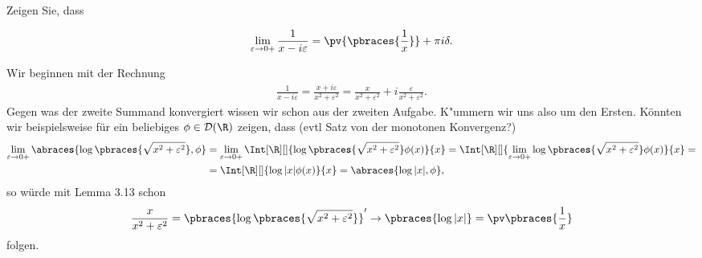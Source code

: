 
\begin{exercise}

Zeigen Sie, dass

\begin{align*}
    \lim_{\varepsilon \to 0+}
    \frac{1}{x - i \varepsilon}
    =
    \pv
    {
        \pbraces
        {
            \frac{1}{x}
        }
    }
    +
    \pi i \delta.
\end{align*}

\end{exercise}


\begin{solution}

Wir beginnen mit der Rechnung 
\begin{align*}
\frac{1}{x - i\varepsilon} = \frac{x + i \varepsilon}{x^2 + \varepsilon^2} = \frac{x}{x^2 + \varepsilon^2} + i\frac{\varepsilon}{x^2 + \varepsilon^2}.
\end{align*}
Gegen was der zweite Summand konvergiert wissen wir schon aus der zweiten Aufgabe. K"ummern wir uns also um den Ersten. Könnten wir beispielsweise für ein beliebiges $\phi \in \mathcal{D}(\R)$ zeigen, dass (evtl Satz von der monotonen Konvergenz?)
\begin{align*}
\lim_{\varepsilon \to 0+} \abraces{\log\pbraces{\sqrt{x^2 + \varepsilon^2}}, \phi}&= \lim_{\varepsilon \to 0+} \Int[\R][]{\log\pbraces{\sqrt{x^2 + \varepsilon^2}} \phi(x)}{x} = \Int[\R][]{\lim_{\varepsilon \to 0+}\log\pbraces{\sqrt{x^2 + \varepsilon^2}} \phi(x)}{x} = \\
&= \Int[\R][]{\log|x| \phi(x)}{x} = \abraces{\log|x|, \phi},
\end{align*}
so würde mit Lemma 3.13 schon 
\begin{align*}
\frac{x}{x^2 + \varepsilon^2} = \pbraces{\log\pbraces{\sqrt{x^2 + \varepsilon^2}}}^\prime \to \pbraces{\log|x|} = \pv\pbraces{\frac{1}{x}}
\end{align*}
folgen.
\end{solution}

